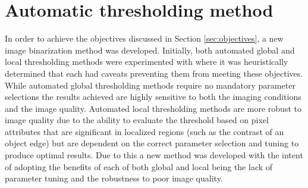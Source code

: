 \section{Automatic thresholding method}
In order to achieve the objectives discussed in Section \ref{sec:objectives}, a new image binarization method was developed. Initially, both automated global and local thresholding methods were experimented with where it was heuristically determined that each had caveats preventing them from meeting these objectives. While automated global thresholding methods require no mandatory parameter selections the results achieved are highly sensitive to both the imaging conditions and the image quality. Automated local thresholding methods are more robust to image quality due to the ability to evaluate the threshold based on pixel attributes that are significant in localized regions (such as the contrast of an object edge) but are dependent on the correct parameter selection and tuning to produce optimal results. Due to this a new method was developed with the intent of adopting the benefits of each of both global and local being the lack of parameter tuning and the robustness to poor image quality.


